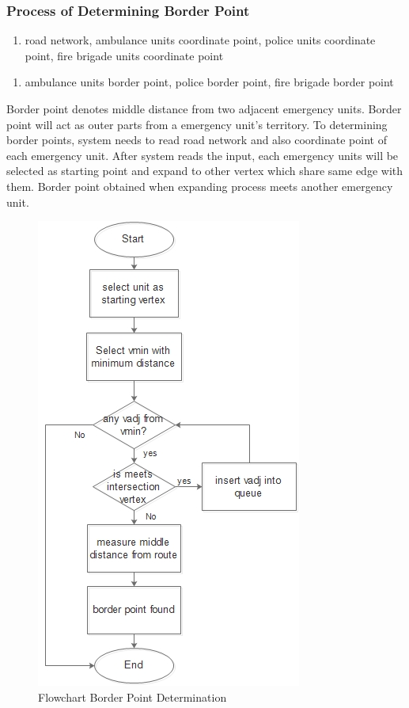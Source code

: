 \pagebreak

\subsubsection{Process of Determining Border Point}
\begin{enumerate}[label=Input\hspace{5mm} :\hspace{2mm}, leftmargin=*, topsep=0pt, itemsep=-1ex, partopsep=1ex, parsep=1ex]
\item road network, ambulance units coordinate point, police units coordinate point, fire brigade units coordinate point
\end{enumerate}
\begin{enumerate}[label=Output\hspace{2mm} :\hspace{2mm}, leftmargin=*, topsep=0pt, itemsep=-1ex, partopsep=1ex, parsep=1ex]
\item ambulance units border point, police border point, fire brigade border point
\end{enumerate}
Border point denotes middle distance from two adjacent emergency units. Border point will act as outer parts from a emergency unit's territory. To determining border points, system needs to read road network and also coordinate point of each emergency unit. After system reads the input, each emergency units will be selected as starting point and expand to other vertex which share same edge with them. Border point obtained when expanding process meets another emergency unit.

\begin{figure}[H]
    \centering
    \includegraphics[scale=0.8]{flowchart_bp.jpg}
    \caption{Flowchart Border Point Determination}
    \label{fig:bp_pol}
\end{figure}

